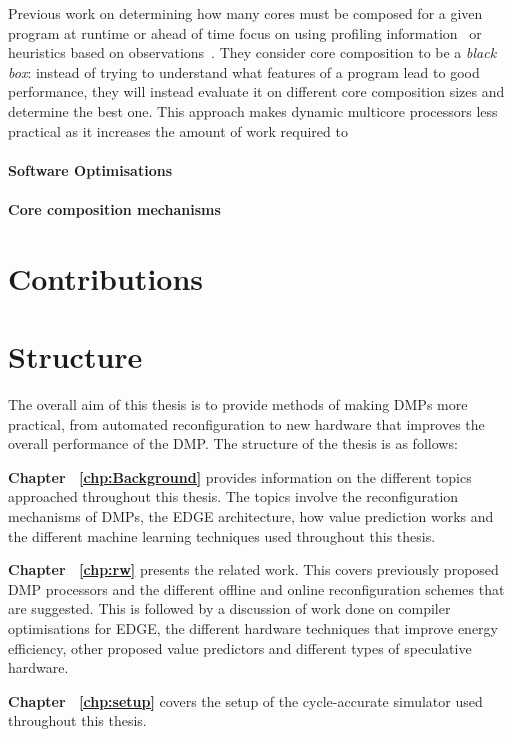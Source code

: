 Previous work on determining how many cores must be composed for a given program at runtime or ahead of time focus on using profiling information~\cite{pricopiSchedCoreComp2014} or heuristics based on observations~\cite{gulati2008multitaskingdmc}.
They consider core composition to be a \textit{black box}: instead of trying to understand what features of a program lead to good performance, they will instead evaluate it on different core composition sizes and determine the best one.
This approach makes dynamic multicore processors less practical as it increases the amount of work required to 

\paragraph*{Software Optimisations}

\paragraph*{Core composition mechanisms} 


\section{Contributions}
\section{Structure}
The overall aim of this thesis is to provide methods of making DMPs more practical, from automated reconfiguration to new hardware that improves the overall performance of the DMP.
The structure of the thesis is as follows:

\textbf{Chapter ~\ref{chp:Background}} provides information on the different topics approached throughout this thesis. The topics involve the reconfiguration mechanisms of DMPs, the EDGE architecture, how value prediction works and the different machine learning techniques used throughout this thesis.

\textbf{Chapter ~\ref{chp:rw}} presents the related work. This covers previously proposed DMP processors and the different offline and online reconfiguration schemes that are suggested. 
This is followed by a discussion of work done on compiler optimisations for EDGE, the different hardware techniques that improve energy efficiency, other proposed value predictors and different types of speculative hardware.

\textbf{Chapter ~\ref{chp:setup}} covers the setup of the cycle-accurate simulator used throughout this thesis.

